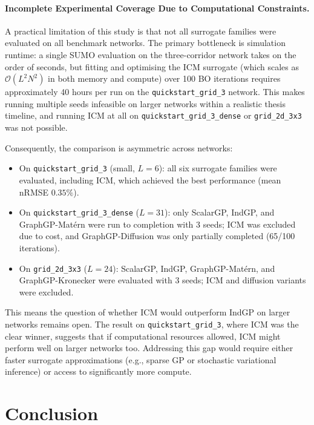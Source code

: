 \documentclass[11pt]{article}
\begin{document}
\paragraph{Incomplete Experimental Coverage Due to Computational Constraints.}

A practical limitation of this study is that not all surrogate families were evaluated on all benchmark networks. The primary bottleneck is simulation runtime: a single SUMO evaluation on the three-corridor network takes on the order of seconds, but fitting and optimising the ICM surrogate (which scales as $\mathcal{O}(L^2 N^2)$ in both memory and compute) over 100 BO iterations requires approximately 40 hours per run on the \texttt{quickstart\_grid\_3} network. This makes running multiple seeds infeasible on larger networks within a realistic thesis timeline, and running ICM at all on \texttt{quickstart\_grid\_3\_dense} or \texttt{grid\_2d\_3x3} was not possible.

Consequently, the comparison is asymmetric across networks:
\begin{itemize}
    \item On \texttt{quickstart\_grid\_3} (small, $L=6$): all six surrogate families were evaluated, including ICM, which achieved the best performance (mean nRMSE $0.35\%$).
    \item On \texttt{quickstart\_grid\_3\_dense} ($L=31$): only ScalarGP, IndGP, and GraphGP-Mat\'ern were run to completion with 3 seeds; ICM was excluded due to cost, and GraphGP-Diffusion was only partially completed (65/100 iterations).
    \item On \texttt{grid\_2d\_3x3} ($L=24$): ScalarGP, IndGP, GraphGP-Mat\'ern, and GraphGP-Kronecker were evaluated with 3 seeds; ICM and diffusion variants were excluded.
\end{itemize}

This means the question of whether ICM would outperform IndGP on larger networks remains open. The result on \texttt{quickstart\_grid\_3}, where ICM was the clear winner, suggests that if computational resources allowed, ICM might perform well on larger networks too. Addressing this gap would require either faster surrogate approximations (e.g., sparse GP or stochastic variational inference) or access to significantly more compute.

\newpage

\section{Conclusion}
\label{sec:conclusion}
\end{document}
